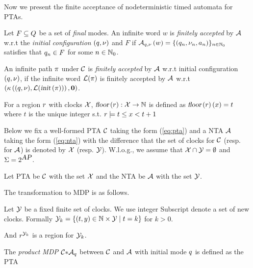 Now we present the finite acceptance of nodeterministic timed automata for PTAs.
\vspace{-0.8em}
\begin{definition}
Let $F\subseteq Q$ be a set of \emph{final} modes.
An infinite word $w$ is \emph{finitely accepted} by $\mathcal{A}$ w.r.t the \emph{initial configuration} $(q,\nu)$ and $F$ if ${\mathcal{A}}_{q,\nu}\left(w\right)=\{(q_n,\nu_n,a_n)\}_{n\in\mathbb{N}_0}$ satisfies that $q_n\in F$ for
some $n\in\mathbb{N}_0$.
\end{definition}

\begin{definition}
An infinite path $\pi$ under $\mathcal{C}$ is \emph{finitely accepted} by $\mathcal{A}$ w.r.t 
initial configuration $(q,\nu)$, if the infinite word $\mathcal{L}(\pi)$ is finitely
accepted by $\mathcal{A}$ w.r.t 
$
\left(\kappa\left((q,\nu), \mathcal{L}(\mbox{\sl init}\left(\pi\right))\right),\mathbf{0}\right)
$.
\end{definition}


\begin{definition}
For a region $r$ with clocks $\mathcal{X}$, $\mbox{\sl floor} \left ( {r} \right ) : \mathcal{X} \rightarrow \mathbb{N}$ 
is defined as $ \mbox{\sl floor} \left ( {r} \right )(x) = t $ where $t$ is the unique integer s.t. 
$r \models t \le x < t+1$
\end{definition}

Below we fix a well-formed PTA $\mathcal{C}$ taking the form (\ref{eq:pta}) and a NTA $\mathcal{A}$ taking the form (\ref{eq:nta}) with the difference that the set of clocks for $\mathcal{C}$ (resp. for $\mathcal{A}$) is denoted by $\mathcal{X}$ (resp. $\mathcal{Y}$).
W.l.o.g., we assume that $\mathcal{X} \cap \mathcal{Y} = \emptyset$ and $\Sigma=2^{\mbox{\sl AP}}$.

Let PTA be $\mathcal{C}$ with the set $\mathcal{X}$ and the NTA be $\mathcal{A}$ with the set $\mathcal{Y}$.

The transformation to MDP is as follows.

Let $\mathcal{Y}$ be a fixed finite set of clocks. We use integer Subscript denote a set of 
new clocks. Formally
$
    \mathcal{Y}_k = \left \{
        \left (
            t,y
        \right ) \in \mathbb{N} \times \mathcal{Y}
        \mid
        t = k
    \right \}
$ for $ k > 0 $.

And $r^{\mathcal{Y}_k}$ is a region for $\mathcal{Y}_k$.

The \emph{product MDP} ${\mathcal{C}}{\ast}{\mathcal{A}_q}$ between $\mathcal{C}$ and $\mathcal{A}$ with initial mode $q$ is defined as the PTA

